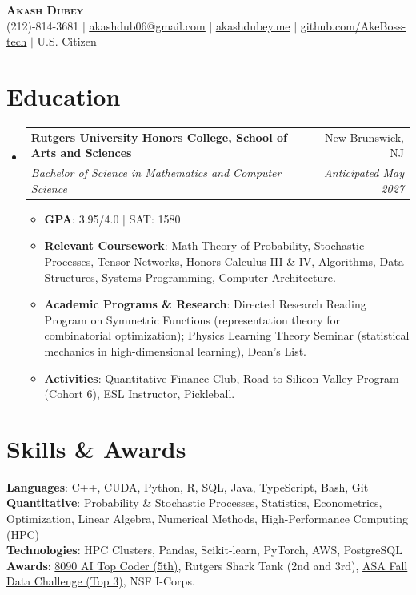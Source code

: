 \documentclass[letterpaper,11pt]{article}
\makeatletter
\newcommand{\resumeItem}[1]{
  \item\small{
    {#1 \vspace{-2pt}}
  }
}
\newcommand{\resumeSubheading}[4]{
  \vspace{-2pt}\item
    \begin{tabular*}{0.97\textwidth}[t]{l@{\extracolsep{\fill}}r}
      \textbf{#1} & #2 \\
      \textit{\small#3} & \textit{\small #4} \\
    \end{tabular*}\vspace{-7pt}
}
\newcommand{\resumeSubHeadingListStart}{\begin{itemize}[leftmargin=0.15in, label={}]}
\newcommand{\resumeSubHeadingListEnd}{\end{itemize}}
\newcommand{\resumeItemListStart}{\begin{itemize}}
\newcommand{\resumeItemListEnd}{\end{itemize}\vspace{-5pt}}
\makeatother
\begin{document}
\begin{center}
    \textbf{\Huge \scshape Akash Dubey} \\ \vspace{1pt}
    \small (212)-814-3681 $|$ \href{mailto:akashdub06@gmail.com}{\underline{akashdub06@gmail.com}} $|$
    \href{https://akashdubey.me/}{\underline{akashdubey.me}} $|$
    \href{https://github.com/AkeBoss-tech}{\underline{github.com/AkeBoss-tech}} $|$
    \small U.S. Citizen
\end{center}
\section{Education}
  \resumeSubHeadingListStart
    \resumeSubheading
      {Rutgers University Honors College, School of Arts and Sciences}{New Brunswick, NJ}
      {Bachelor of Science in Mathematics and Computer Science}{Anticipated May 2027}
      \resumeItemListStart
        \resumeItem{\textbf{GPA}: 3.95/4.0 $|$ SAT: 1580}
        \resumeItem{\textbf{Relevant Coursework}: Math Theory of Probability, Stochastic Processes, Tensor Networks, Honors Calculus III \& IV, Algorithms, Data Structures, Systems Programming, Computer Architecture.}
        \resumeItem{\textbf{Academic Programs \& Research}: Directed Research Reading Program on Symmetric Functions (representation theory for combinatorial optimization); Physics Learning Theory Seminar (statistical mechanics in high-dimensional learning), Dean's List.}
        \resumeItem{\textbf{Activities}: Quantitative Finance Club, Road to Silicon Valley Program (Cohort 6), ESL Instructor, Pickleball.}
      \resumeItemListEnd
  \resumeSubHeadingListEnd
\section{Skills \& Awards}
 \begin{itemize}[leftmargin=0.15in, label={}]
    \small{\item{
     \textbf{Languages}{: C++, CUDA, Python, R, SQL, Java, TypeScript, Bash, Git} \\
     \textbf{Quantitative}{: Probability \& Stochastic Processes, Statistics, Econometrics, Optimization, Linear Algebra, Numerical Methods, High-Performance Computing (HPC)} \\
     \textbf{Technologies}{: HPC Clusters, Pandas, Scikit-learn, PyTorch, AWS, PostgreSQL} \\
     \textbf{Awards}{: \href{https://github.com/AkeBoss-tech/top-coder-challenge}{8090 AI Top Coder (5th)}, Rutgers Shark Tank (2nd and 3rd), \href{https://acashmoney.biz/portfolio/asa-fall-data/}{ASA Fall Data Challenge (Top 3)}, NSF I-Corps.}
    }}
 \end{itemize}
\end{document}
